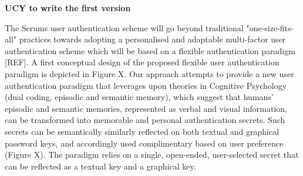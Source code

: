\textbf{UCY to write the first version}

The Serums user authentication scheme will go beyond traditional "one-size-fits-all" practices towards adopting a personalised and adaptable multi-factor user authentication scheme 
which will be based on a flexible authentication paradigm [REF]. A first conceptual design of the proposed flexible user authentication paradigm is depicted in Figure X. Our approach attempts to provide a new user authentication paradigm that leverages upon theories in Cognitive Psychology 
(dual coding, episodic and semantic memory), which suggest that humans' episodic and semantic memories, 
represented as verbal and visual information, can be transformed into memorable and personal authentication secrets. Such secrets can be semantically similarly reflected on both textual and graphical password keys, and accordingly used complimentary based on user preference (Figure X). The paradigm relies on a single, open-ended, user-selected secret that can be 
reflected as a textual key and a graphical key. 
